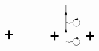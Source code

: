 \begin{equation}
\begin{tikzpicture}[x=0.55pt,y=0.55pt,yscale=-1,xscale=1]
\draw   (272.1,94.26) .. controls (272.1,89.98) and (275.57,86.51) .. (279.85,86.51) .. controls (284.13,86.51) and (287.6,89.98) .. (287.6,94.26) .. controls (287.6,98.54) and (284.13,102.01) .. (279.85,102.01) .. controls (275.57,102.01) and (272.1,98.54) .. (272.1,94.26) -- cycle ;
\draw    (257.24,94.26) .. controls (258.91,92.59) and (260.57,92.59) .. (262.24,94.26) .. controls (263.91,95.93) and (265.57,95.93) .. (267.24,94.26) -- (272.1,94.26) -- (272.1,94.26) ;
\draw  [fill={rgb, 255:red, 0; green, 0; blue, 0 }  ,fill opacity=1 ] (276.95,86.72) -- (282.59,84.11) -- (282.91,88.48) -- cycle ;
\draw    (257.14,14.82) -- (257.14,71) ;
\draw  [fill={rgb, 255:red, 0; green, 0; blue, 0 }  ,fill opacity=1 ] (257.19,29.9) -- (259.38,35.72) -- (255,35.72) -- cycle ;
\draw  [fill={rgb, 255:red, 0; green, 0; blue, 0 }  ,fill opacity=1 ] (257.14,68.09) -- (259.33,73.91) -- (254.95,73.91) -- cycle ;
\draw   (272.1,53.26) .. controls (272.1,48.98) and (275.57,45.51) .. (279.85,45.51) .. controls (284.13,45.51) and (287.6,48.98) .. (287.6,53.26) .. controls (287.6,57.54) and (284.13,61.01) .. (279.85,61.01) .. controls (275.57,61.01) and (272.1,57.54) .. (272.1,53.26) -- cycle ;
\draw    (257.24,53.26) .. controls (258.91,51.59) and (260.57,51.59) .. (262.24,53.26) .. controls (263.91,54.93) and (265.57,54.93) .. (267.24,53.26) -- (272.1,53.26) -- (272.1,53.26) ;
\draw  [fill={rgb, 255:red, 0; green, 0; blue, 0 }  ,fill opacity=1 ] (276.95,45.72) -- (282.59,43.11) -- (282.91,47.48) -- cycle ;
\draw [line width=1.5]    (125.25,78.8) -- (142.25,78.8) ;
\draw [line width=1.5]    (133.75,88.4) -- (133.75,69.21) ;

\draw [line width=1.5]    (224.25,81.8) -- (241.25,81.8) ;
\draw [line width=1.5]    (232.75,91.4) -- (232.75,72.21) ;

\draw [line width=1.5]    (301.25,81.8) -- (318.25,81.8) ;
\draw [line width=1.5]    (309.75,91.4) -- (309.75,72.21) ;


\end{tikzpicture}
\end{equation}
